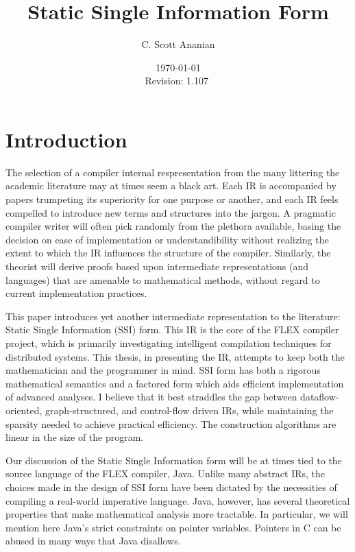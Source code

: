 \documentclass[12pt,titlepage,twoside]{article}
\title{Static Single Information Form
}
\author{C. Scott Ananian}
\date{\today \\ $ $Revision: 1.107 $ $}
\let\oldsection\section
\renewcommand{\section}{\setcounter{figure}{0}\setcounter{table}{0}\oldsection}
\begin{document}


\pagestyle{empty}
\maketitle\cleardoublepage
\pagestyle{myheadings}
\tableofcontents\listoffigures\listoftables\listofalgorithms\cleardoublepage
{}

\section{Introduction}
The selection of a compiler internal respresentation from the many
littering the academic literature may at times seem a black art.  Each
IR is accompanied by papers trumpeting its superiority for one purpose
or another, and each IR feels compelled to introduce new terms and
structures into the jargon.  A pragmatic compiler writer will often
pick randomly from the plethora available, basing the decision on ease
of implementation or understandibility without realizing the extent to
which the IR influences the structure of the compiler.  Similarly, the
theorist will derive proofs based upon intermediate representations
(and languages) that are amenable to mathematical methods, without
regard to current implementation practices.%

This paper introduces yet another intermediate
representation to the literature:  Static Single Information (SSI) form.
This IR is the core of the FLEX compiler project, which is primarily
investigating intelligent compilation techniques for distributed
systems.  This thesis, in presenting the IR,
attempts to keep both the mathematician and the programmer in mind.  
SSI form has both a rigorous mathematical semantics and a factored
form which aids efficient implementation of advanced analyses.
I believe that it best straddles the gap between dataflow-oriented,
graph-structured, and control-flow driven IRs, while maintaining the
sparsity needed to achieve practical efficiency.  The construction
algorithms are linear in the size of the program.

Our discussion of the Static Single Information form will be at times
tied to the source language of the FLEX compiler, Java.  Unlike many
abstract IRs, the choices made in the design of SSI form have been
dictated by the necessities of compiling a real-world imperative
language.  Java, however, has several theoretical properties that make
mathematical analysis more tractable.  In particular, we
will mention here Java's strict constraints on pointer variables.
Pointers in C can be abused in many ways that Java disallows.
\end{document}
